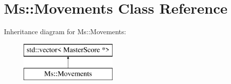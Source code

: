 \hypertarget{class_ms_1_1_movements}{}\section{Ms\+:\+:Movements Class Reference}
\label{class_ms_1_1_movements}
Inheritance diagram for Ms\+:\+:Movements\+:\begin{figure}[H]
\begin{center}
\leavevmode
\includegraphics[height=2.000000cm]{class_ms_1_1_movements}
\end{center}
\end{figure}
